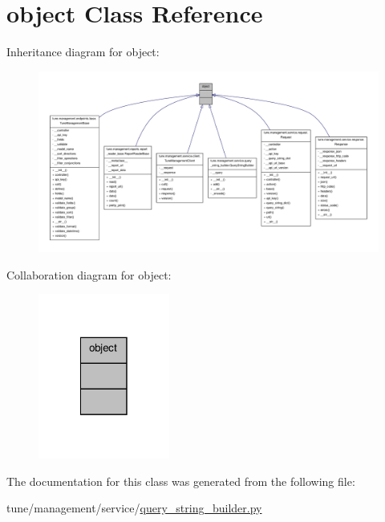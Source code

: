 \hypertarget{classobject}{\section{object Class Reference}
\label{classobject}
}


Inheritance diagram for object\-:
\nopagebreak
\begin{figure}[H]
\begin{center}
\leavevmode
\includegraphics[width=350pt]{classobject__inherit__graph}
\end{center}
\end{figure}


Collaboration diagram for object\-:
\nopagebreak
\begin{figure}[H]
\begin{center}
\leavevmode
\includegraphics[width=122pt]{classobject__coll__graph}
\end{center}
\end{figure}


The documentation for this class was generated from the following file\-:\begin{DoxyCompactItemize}
\item 
tune/management/service/\hyperlink{query__string__builder_8py}{query\-\_\-string\-\_\-builder.\-py}\end{DoxyCompactItemize}
